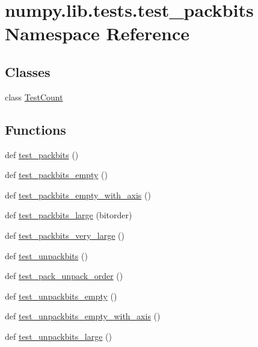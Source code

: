 \hypertarget{namespacenumpy_1_1lib_1_1tests_1_1test__packbits}{}\section{numpy.\+lib.\+tests.\+test\+\_\+packbits Namespace Reference}
\label{namespacenumpy_1_1lib_1_1tests_1_1test__packbits}
\subsection*{Classes}
\begin{DoxyCompactItemize}
\item 
class \hyperlink{classnumpy_1_1lib_1_1tests_1_1test__packbits_1_1TestCount}{Test\+Count}
\end{DoxyCompactItemize}
\subsection*{Functions}
\begin{DoxyCompactItemize}
\item 
def \hyperlink{namespacenumpy_1_1lib_1_1tests_1_1test__packbits_a823433d9d70d847a05de0a5f3d85b73d}{test\+\_\+packbits} ()
\item 
def \hyperlink{namespacenumpy_1_1lib_1_1tests_1_1test__packbits_a2fbca6554765473a526c26ef57a24ad2}{test\+\_\+packbits\+\_\+empty} ()
\item 
def \hyperlink{namespacenumpy_1_1lib_1_1tests_1_1test__packbits_ab8cd8fd5aedb36d20dffaaaf29705001}{test\+\_\+packbits\+\_\+empty\+\_\+with\+\_\+axis} ()
\item 
def \hyperlink{namespacenumpy_1_1lib_1_1tests_1_1test__packbits_acfd14d8c7420ffa449492ffc19378ce1}{test\+\_\+packbits\+\_\+large} (bitorder)
\item 
def \hyperlink{namespacenumpy_1_1lib_1_1tests_1_1test__packbits_af9d90965e964cac7c16801bda57d8a12}{test\+\_\+packbits\+\_\+very\+\_\+large} ()
\item 
def \hyperlink{namespacenumpy_1_1lib_1_1tests_1_1test__packbits_a8bfe25726dedfd694239185ff191778f}{test\+\_\+unpackbits} ()
\item 
def \hyperlink{namespacenumpy_1_1lib_1_1tests_1_1test__packbits_a34dd4d571e658933684282c7962baecb}{test\+\_\+pack\+\_\+unpack\+\_\+order} ()
\item 
def \hyperlink{namespacenumpy_1_1lib_1_1tests_1_1test__packbits_a92bea15f6c5c567ac4ff213e923662c7}{test\+\_\+unpackbits\+\_\+empty} ()
\item 
def \hyperlink{namespacenumpy_1_1lib_1_1tests_1_1test__packbits_a537ecde1f1f6a4d475442f3ff4ace50c}{test\+\_\+unpackbits\+\_\+empty\+\_\+with\+\_\+axis} ()
\item 
def \hyperlink{namespacenumpy_1_1lib_1_1tests_1_1test__packbits_afbc78fe8f6404e7cc89047c9d0ab18b0}{test\+\_\+unpackbits\+\_\+large} ()
\end{DoxyCompactItemize}


